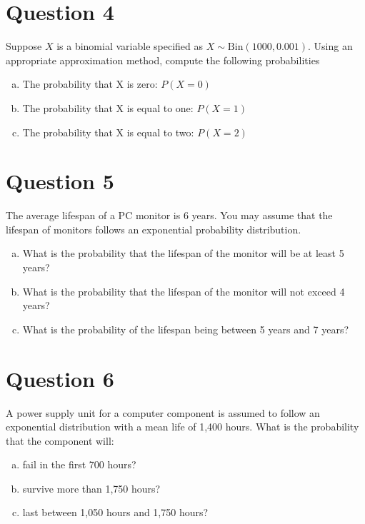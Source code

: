 \documentclass[]{article}
\begin{document}
\section*{Question 4}
Suppose $X$ is a binomial variable specified as $X \sim \mbox{Bin}(1000,0.001)$. Using an appropriate approximation method, compute the following probabilities
\begin{enumerate}[(a)]
    \item The probability that X is zero: $P(X=0)$
\item The probability that X is equal to one:  $P(X=1)$
\item The probability that X is equal to two:  $P(X=2)$
\end{enumerate}


\section*{Question 5}
The average lifespan of a PC monitor is 6 years. You may assume that the lifespan of monitors
follows an exponential probability distribution.
\begin{enumerate}[(a)]
    \item  What is the probability that the lifespan of the monitor will be at least 5 years?
\item What is the probability that the lifespan of the monitor will not exceed 4 years?
\item  What is the probability of the lifespan being between 5 years and 7 years?
\end{enumerate}


\section*{Question 6}
A power supply unit for a computer component is assumed to follow an
exponential distribution with a mean life of 1,400 hours. What is the
probability that the component will:

\begin{enumerate}[(a)]
\item  fail in the first 700 hours?
\item  survive more than 1,750 hours?
\item  last between 1,050 hours and 1,750 hours?
\end{enumerate}

\end{document}
